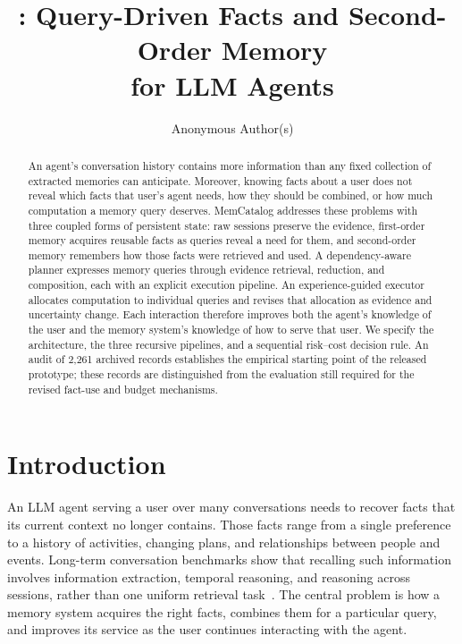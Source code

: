 \documentclass[10pt,twocolumn]{article}
\title{\sys: Query-Driven Facts and Second-Order Memory\\
for LLM Agents}
\author{Anonymous Author(s)}
\date{}
\newcommand{\sys}{MemCatalog}
\begin{document}
\maketitle

\begin{abstract}
An agent's conversation history contains more information than any fixed
collection of extracted memories can anticipate. Moreover, knowing facts
about a user does not reveal which facts that user's agent needs, how they
should be combined, or how much computation a memory query deserves.
\sys{} addresses these problems with three coupled forms of persistent
state: raw sessions preserve the evidence, first-order memory acquires
reusable facts as queries reveal a need for them, and second-order memory
remembers how those facts were retrieved and used. A dependency-aware
planner expresses memory queries through evidence retrieval, reduction,
and composition, each with an explicit execution pipeline. An
experience-guided executor allocates computation to individual queries
and revises that allocation as evidence and uncertainty change. Each
interaction therefore improves both the agent's knowledge of the user
and the memory system's knowledge of how to serve that user. We specify
the architecture, the three recursive pipelines, and a sequential
risk--cost decision rule. An audit of 2,261 archived records establishes
the empirical starting point of the released prototype; these records
are distinguished from the evaluation still required for the revised
fact-use and budget mechanisms.
\end{abstract}

\section{Introduction}
\label{sec:new-introduction}

An LLM agent serving a user over many conversations needs to recover
facts that its current context no longer contains. Those facts range
from a single preference to a history of activities, changing plans,
and relationships between people and events. Long-term conversation
benchmarks show that recalling such information involves information
extraction, temporal reasoning, and reasoning across sessions, rather
than one uniform retrieval task~\cite{locomo,longmemeval}. The central
problem is how a memory system acquires the right facts, combines them
for a particular query, and improves its service as the user continues
interacting with the agent.
\end{document}
